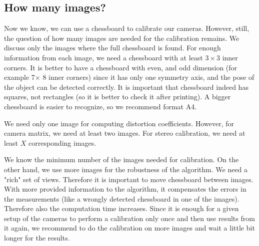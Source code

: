 \subsection{How many images?} Now we know, we can use a chessboard to calibrate
our cameras. However, still, the question of how many images are needed for the
calibration remains. We discuss only the images where the full chessboard is
found. For enough information from each image, we need a chessboard with at
least $3\times3$ inner corners. It is better to have a chessboard with even,
and odd dimension (for example 7$\times$ 8 inner corners) since it has only one
symmetry axis, and the pose of the object can be detected correctly. It is
important that chessboard indeed has squares, not rectangles (so it is better
to check it after printing). A bigger chessboard is easier to recognize, so we
recommend format A4.

We need only one image for computing distortion coefficients. However, for
camera matrix, we need at least two images. For stereo calibration, we need at
least $X$ corresponding images.

We know the minimum number of the images needed for calibration. On the other
hand, we use more images for the robustness of the algorithm. We need a "rich"
set of views. Therefore it is important to move chessboard between images. With
more provided information to the algorithm, it compensates the errors in the
measurements (like a wrongly detected chessboard in one of the images).
Therefore also the computation time increases. Since it is enough for a given
setup of the cameras to perform a calibration only once and then use results
from it again, we recommend to do the calibration on more images and wait a
little bit longer for the results. 


